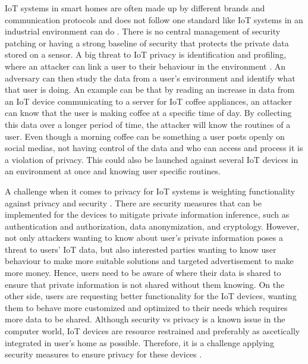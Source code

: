 \gls{IoT} systems in smart homes are often made up by different brands and communication protocols and does not follow one standard like \gls{IoT} systems in an industrial environment can do \cite{IoTPrivSecSmarthome}. There is no central management of security patching or having a strong baseline of security that protects the private data stored on a sensor. A big threat to \gls{IoT} privacy is identification and profiling, where an attacker can link a user to their behaviour in the environment \cite{IoTSecPrivSafeEth}. An adversary can then study the data from a user's environment and identify what that user is doing. An example can be that by reading an increase in data from an \gls{IoT} device communicating to a server for \gls{IoT} coffee appliances, an attacker can know that the user is making coffee at a specific time of day. By collecting this data over a longer period of time, the attacker will know the routines of a user. Even though a morning coffee can be something a user posts openly on social medias, not having control of the data and who can access and process it is a violation of privacy. This could also be launched against several \gls{IoT} devices in an environment at once and knowing user specific routines. 

A challenge when it comes to privacy for \gls{IoT} systems is weighting functionality against privacy and security \cite{PrivacyIoTSurvey}. There are security measures that can be implemented for the devices to mitigate private information inference, such as authentication and authorization, data anonymization, and cryptology. However, not only attackers wanting to know about user's private information poses a threat to users' \gls{IoT} data, but also interested parties wanting to know user behaviour to make more suitable solutions and targeted advertisement to make more money. Hence, users need to be aware of where their data is shared to ensure that private information is not shared without them knowing. On the other side, users are requesting better functionality for the \gls{IoT} devices, wanting them to behave more customized and optimized to their needs which requires more data to be shared. Although security vs privacy is a known issue in the computer world, \gls{IoT} devices are resource restrained and preferably as ascetically integrated in user's home as possible. Therefore, it is a challenge applying security measures to ensure privacy for these devices \cite{PrivacyIoTSurvey}. 

